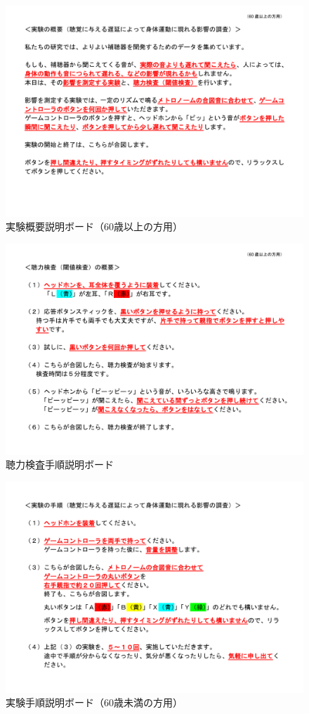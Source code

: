 \begin{figure}[ht]
  \centering
  \includegraphics[scale=0.4]{furoku_A/MoreThan60_Gaiyou.pdf}
  \caption{実験概要説明ボード（60歳以上の方用）}
\end{figure}
\begin{figure}[ht]
  \centering
  \includegraphics[scale=0.4]{furoku_A/MoreThan60_tyouryoku.pdf}
  \caption{聴力検査手順説明ボード}
\end{figure}
\begin{figure}[ht]
  \centering
  \includegraphics[scale=0.4]{furoku_A/Less60_Tezyunn.pdf}
  \caption{実験手順説明ボード（60歳未満の方用）}
\end{figure}
